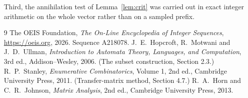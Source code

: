 \documentclass[11pt,a4paper]{article}
\theoremstyle{plain}
\theoremstyle{definition}
\begin{document}
Third, the annihilation test of Lemma~\ref{lem:crit} was carried out in exact integer
arithmetic on the whole vector rather than on a sampled prefix.

\begin{thebibliography}{9}
 The OEIS Foundation, \emph{The On-Line Encyclopedia of Integer
Sequences}, \url{https://oeis.org}, 2026. Sequence A218078.
 J.~E.~Hopcroft, R.~Motwani and J.~D.~Ullman, \emph{Introduction to Automata
Theory, Languages, and Computation}, 3rd ed., Addison--Wesley, 2006. (The subset
construction, Section 2.3.)
 R.~P.~Stanley, \emph{Enumerative Combinatorics}, Volume 1, 2nd ed.,
Cambridge University Press, 2011. (Transfer-matrix method, Section 4.7.)
 R.~A.~Horn and C.~R.~Johnson, \emph{Matrix Analysis}, 2nd ed., Cambridge
University Press, 2013.
\end{thebibliography}
\end{document}
